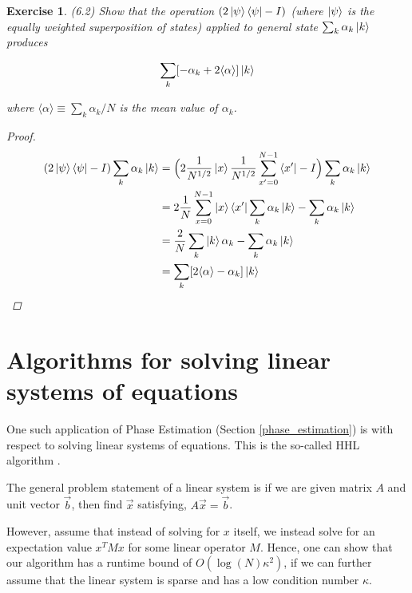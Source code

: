 \documentclass[11pt]{article}
\newcommand\0{\mathbf{0}}
\newcommand\<{\langle}
\renewcommand\>{\rangle}
\newtheorem{exercise}[theorem]{Exercise}
\begin{document}
\begin{exercise}(6.2) Show that the operation $(2 \ket{\psi}\bra{\psi} - I)$ (where $\ket{\psi}$ is the equally weighted superposition of states) applied to general state $\sum_k \alpha_k \ket{k}$ produces 

\begin{align*}
\sum_k [ -\alpha_k + 2\langle \alpha \rangle ] \ket{k}	
\end{align*}
	
	where $\langle \alpha \rangle \equiv \sum_k \alpha_k / N$ is the mean value of $\alpha_k$. 
	
	\begin{proof}
		\begin{align*}
			(2 \ket{\psi}\bra{\psi} - I) \sum_k \alpha_k \ket{k} &= \Big(2\frac{1}{N^{1/2}}\ket{x} \frac{1}{N^{1/2}} \sum_{x'=0}^{N-1} \bra{x'} - I\Big)\sum_k \alpha_k \ket{k} \\
			&= 2\frac{1}{N} \sum_{x=0}^{N-1} \ket{x}\bra{x'}\sum_k \alpha_k \ket{k} -\sum_k \alpha_k \ket{k} \\
			&= \frac{2}{N} \sum_k \ket{k}  \alpha_k -\sum_k \alpha_k \ket{k} \\
			&= \sum_k [ 2\langle \alpha \rangle -\alpha_k ] \ket{k}
		\end{align*}

	\end{proof}

\end{exercise}


\section{Algorithms for solving linear systems of equations}

One such application of Phase Estimation (Section \ref{phase_estimation}) is with respect to solving linear systems of equations. This is the so-called HHL algorithm \cite{lloyd2010quantum}.

The general problem statement of a linear system is if we are given matrix $A$ and unit vector $\vec{b}$, then find $\vec{x}$ satisfying, $A\vec{x} = \vec{b}$. 

However, assume that instead of solving for $x$ itself, we instead solve for an expectation value $x^T M x$ for some linear operator $M$. Hence, one can show that our algorithm has a runtime bound of $O(\log(N)\kappa ^{2})$, if we can further assume that the linear system is sparse and has a low condition number $\kappa$.
\end{document}
